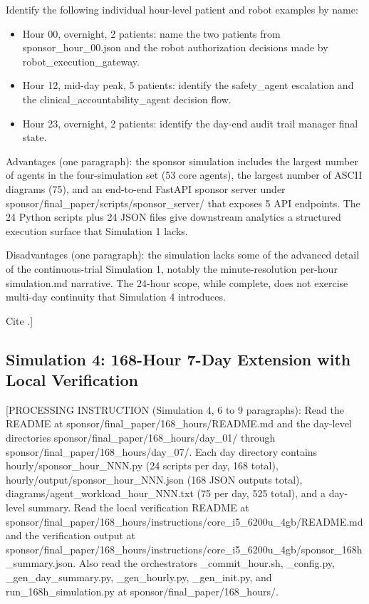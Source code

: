 Identify the following individual hour-level patient and robot examples
by name:
\begin{itemize}[leftmargin=*]
\item Hour 00, overnight, 2 patients: name the two patients from
sponsor\_hour\_00.json and the robot authorization decisions made by
robot\_execution\_gateway.
\item Hour 12, mid-day peak, 5 patients: identify the safety\_agent
escalation and the clinical\_accountability\_agent decision flow.
\item Hour 23, overnight, 2 patients: identify the day-end audit trail
manager final state.
\end{itemize}

Advantages (one paragraph): the sponsor simulation includes the largest
number of agents in the four-simulation set (53 core agents), the largest
number of ASCII diagrams (75), and an end-to-end FastAPI sponsor server
under sponsor/final\_paper/scripts/sponsor\_server/ that exposes 5 API
endpoints. The 24 Python scripts plus 24 JSON files give downstream
analytics a structured execution surface that Simulation 1 lacks.

Disadvantages (one paragraph): the simulation lacks some of the advanced
detail of the continuous-trial Simulation 1, notably the minute-resolution
per-hour simulation.md narrative. The 24-hour scope, while complete, does
not exercise multi-day continuity that Simulation 4 introduces.

Cite \cite{kawchak_2026_19396256}.]

\subsection{Simulation 4: 168-Hour 7-Day Extension with Local Verification}
\label{sec:results-sim4}

[PROCESSING INSTRUCTION (Simulation 4, 6 to 9 paragraphs): Read the
README at sponsor/final\_paper/168\_hours/README.md and the day-level
directories sponsor/final\_paper/168\_hours/day\_01/ through
sponsor/final\_paper/168\_hours/day\_07/. Each day directory contains
hourly/sponsor\_hour\_NNN.py (24 scripts per day, 168 total),
hourly/output/sponsor\_hour\_NNN.json (168 JSON outputs total),
diagrams/agent\_workload\_hour\_NNN.txt (75 per day, 525 total), and a
day-level summary. Read the local verification README at
sponsor/final\_paper/168\_hours/instructions/core\_i5\_6200u\_4gb/README.md
and the verification output at
sponsor/final\_paper/168\_hours/instructions/core\_i5\_6200u\_4gb/sponsor\_168h\_summary.json.
Also read the orchestrators _commit_hour.sh, \_config.py, \_gen\_day\_summary.py,
\_gen\_hourly.py, \_gen\_init.py, and run\_168h\_simulation.py at
sponsor/final\_paper/168\_hours/.


